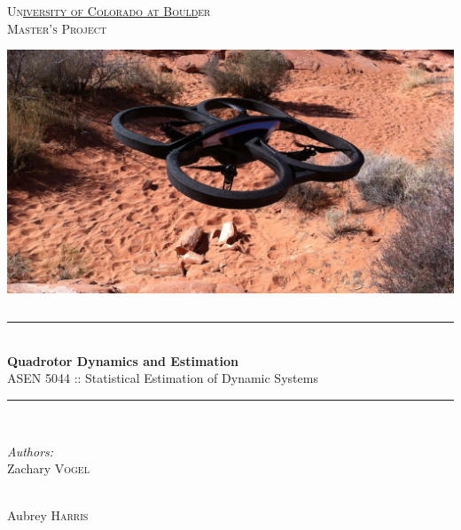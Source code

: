 \documentclass[12pt]{extarticle}
\newcommand{\HRule}{\rule{\linewidth}{0.5mm}}
\begin{document}
	\begin{titlepage}
		\begin{center}
			\textsc{\LARGE Un\underline{iversity of Colorado at Bould}er}\\[0.5cm]
			\textsc{\Large Master's Project}\\[2cm]
			\includegraphics[height=8cm]{Title/parrotar}\\[2cm]
			\HRule \\[0.4cm]
			{ \LARGE \bfseries Quadrotor Dynamics and Estimation\\[0.2cm]}\small ASEN 5044 :: Statistical Estimation of Dynamic Systems\\[0.4cm]
			\HRule \\[1cm]
				\begin{minipage}{0.4\textwidth}
					\begin{flushleft} \large
						\hspace*{-1em}\emph{Authors:}\\
						Zachary \textsc{Vogel}\\
					\end{flushleft}
				\end{minipage}
				\begin{minipage}{0.4\textwidth}
					\begin{flushright} \large
						\hspace{-2em}\emph{ } \\
						Aubrey \textsc{Harris}
					\end{flushright}
				\end{minipage}
				\vfill
				\vspace{.75cm}
				\begin{minipage}{0.4\textwidth}

\end{minipage}
\end{center}
\end{titlepage}
\end{document}
